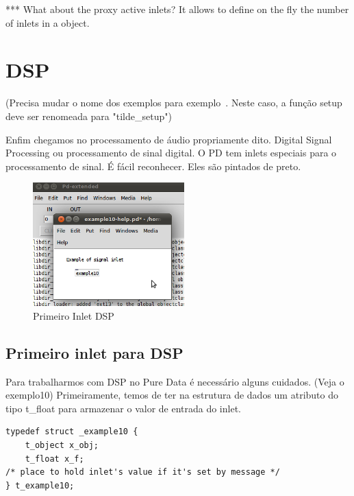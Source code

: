 \documentclass[10pt,a4paper]{report}
\begin{document}
*** What about the proxy active inlets? It allows to define on the fly the number of inlets in a object.


\chapter{DSP}
 (Precisa mudar o nome dos exemplos para exemplo~. Neste caso, a função setup deve ser renomeada para "tilde\_setup")

Enfim chegamos no processamento de áudio propriamente dito. Digital Signal Processing ou processamento de sinal digital. O PD tem inlets especiais para o processamento de sinal. É fácil reconhecer. Eles são pintados de preto.
\begin{figure}[h!]
	\centering
	\includegraphics[height=180]{./images/example10}
	\caption{Primeiro Inlet DSP}
\end{figure}

\section{Primeiro inlet para DSP}
Para trabalharmos com DSP no Pure Data é necessário alguns cuidados. (Veja o exemplo10) Primeiramente, temos de ter na estrutura de dados um atributo do tipo t\_float para armazenar o valor de entrada do inlet.

\begin{lstlisting}
typedef struct _example10 {
    t_object x_obj;
    t_float x_f;
/* place to hold inlet's value if it's set by message */
} t_example10;
\end{lstlisting}
\end{document}
